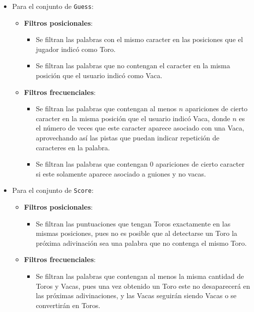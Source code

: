 \documentclass[11pt]{article}
\begin{document}
\begin{itemize}
   \item Para el conjunto de \texttt{Guess}:
   \begin{itemize}
      \item \textbf{Filtros posicionales}:
      \begin{itemize}
         \item Se filtran las palabras con el mismo caracter en las posiciones que el
         jugador indicó como Toro.
         \item Se filtran las palabras que no contengan el caracter en la misma posición
         que el usuario indicó como Vaca.
      \end{itemize}
      \item \textbf{Filtros frecuenciales}:
      \begin{itemize}
         \item Se filtran las palabras que contengan al menos $n$ apariciones de cierto
         caracter en la misma posición que el usuario indicó Vaca, donde $n$ es el
         número de veces que este caracter aparece asociado con una Vaca, aprovechando
         así las pistas que puedan indicar repetición de caracteres en la palabra.
         \item Se filtran las palabras que contengan 0 apariciones de cierto caracter si este solamente aparece asociado a guiones y no vacas.
      \end{itemize}
   \end{itemize}
   \item Para el conjunto de \texttt{Score}:
   \begin{itemize}
      \item \textbf{Filtros posicionales}:
      \begin{itemize}
         \item Se filtran las puntuaciones que tengan Toros exactamente en las mismas
         posiciones, pues no es posible que al detectarse un Toro la próxima adivinación
         sea una palabra que no contenga el mismo Toro.
      \end{itemize}
      \item \textbf{Filtros frecuenciales}:
      \begin{itemize}
         \item Se filtran las palabras que contengan al menos la misma cantidad de Toros y Vacas, pues una vez obtenido un Toro este no desaparecerá en las
         próximas adivinaciones, y las Vacas seguirán siendo Vacas o se convertirán
         en Toros.
      \end{itemize}
   \end{itemize}
\end{itemize}
\end{document}
